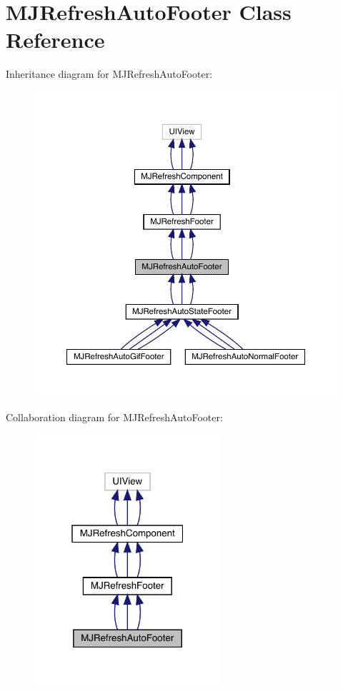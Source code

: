 \hypertarget{interface_m_j_refresh_auto_footer}{}\section{M\+J\+Refresh\+Auto\+Footer Class Reference}
\label{interface_m_j_refresh_auto_footer}


Inheritance diagram for M\+J\+Refresh\+Auto\+Footer\+:\nopagebreak
\begin{figure}[H]
\begin{center}
\leavevmode
\includegraphics[width=350pt]{interface_m_j_refresh_auto_footer__inherit__graph}
\end{center}
\end{figure}


Collaboration diagram for M\+J\+Refresh\+Auto\+Footer\+:\nopagebreak
\begin{figure}[H]
\begin{center}
\leavevmode
\includegraphics[width=196pt]{interface_m_j_refresh_auto_footer__coll__graph}
\end{center}
\end{figure}
